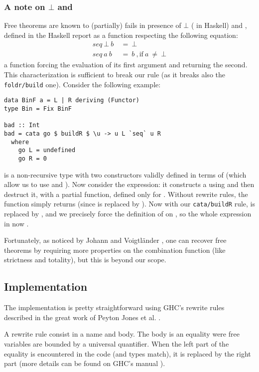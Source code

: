 \subsubsection{A note on $\bot$ and }
\label{sec:seq}
Free theorems are known to (partially) fails in presence of $\bot$ ( in Haskell) and , defined in the Haskell report \cite{haskellReport} as a function respecting the following equation:
\begin{align*}
seq\ \bot\ b\ &=\ \bot\\
seq\ a\ b\ &=\ b\ \mathrm{,if}\ a\ \neq\ \bot
\end{align*}
 a function forcing the evaluation of its first argument and returning the second. This characterization is sufficient to break our rule (as it breaks also the \verb|foldr/build| one). Consider the following example:

\begin{verbatim}
data BinF a = L | R deriving (Functor)
type Bin = Fix BinF

bad :: Int
bad = cata go $ buildR $ \u -> u L `seq` u R
  where
    go L = undefined
    go R = 0
\end{verbatim}
 is a non-recursive type with two constructors validly defined in terms of  (which allow us to use  and ). Now consider the  expression: it constructs a  using  and then destruct it, with a partial function, defined only for . Without rewrite rules, the function simply returns  (since  is replaced by ). Now with our \verb|cata/buildR| rule,  is replaced by , and we precisely force the definition of  on , so the whole expression in now .

Fortunately, as noticed by Johann and Voigtländer \cite{JV04}, one can recover free theorems by requiring more properties on the combination function (like strictness and totality), but this is beyond our scope.

\subsection{Implementation}
The implementation is pretty straightforward using GHC's rewrite rules described in the great work of Peyton Jones et al. \cite{pbr}.

A rewrite rule consist in a name and body. The body is an equality were free variables are bounded by a universal quantifier. When the left part of the equality is encountered in the code (and types match), it is replaced by the right part (more details can be found on GHC's manual \cite{ghc:manual}).

